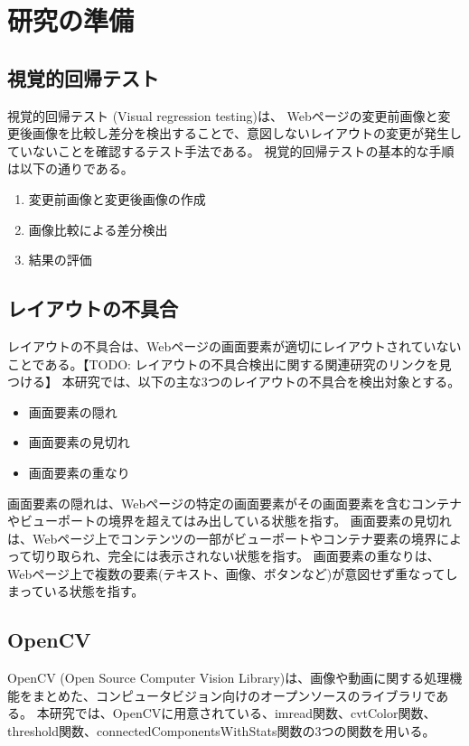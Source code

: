 \chapter{研究の準備}\label{cha:Preparation}

\section{視覚的回帰テスト}\label{sec:vrt}
視覚的回帰テスト (Visual regression testing)\cite{Visual regression testing}は、
Webページの変更前画像と変更後画像を比較し差分を検出することで、意図しないレイアウトの変更が発生していないことを確認するテスト手法である。
視覚的回帰テストの基本的な手順は以下の通りである。
\begin{enumerate}
    \setlength{\itemsep}{0pt}
          \setlength{\parsep}{0pt}
    \item 変更前画像と変更後画像の作成
    \item 画像比較による差分検出
    \item 結果の評価
\end{enumerate}

\section{レイアウトの不具合}\label{sec:layout effect}
レイアウトの不具合は、Webページの画面要素が適切にレイアウトされていないことである。【TODO: レイアウトの不具合検出に関する関連研究のリンクを見つける】
本研究では、以下の主な3つのレイアウトの不具合を検出対象とする。
\begin{itemize}
    \setlength{\itemsep}{0pt}
          \setlength{\parsep}{0pt}
    \item 画面要素の隠れ
    \item 画面要素の見切れ
    \item 画面要素の重なり
\end{itemize}
画面要素の隠れは、Webページの特定の画面要素がその画面要素を含むコンテナやビューポートの境界を超えてはみ出している状態を指す。
画面要素の見切れは、Webページ上でコンテンツの一部がビューポートやコンテナ要素の境界によって切り取られ、完全には表示されない状態を指す。
画面要素の重なりは、Webページ上で複数の要素(テキスト、画像、ボタンなど)が意図せず重なってしまっている状態を指す。

\section{OpenCV}
\label{sec:opencv}
OpenCV (Open Source Computer Vision Library)は、画像や動画に関する処理機能をまとめた、コンピュータビジョン向けのオープンソースのライブラリである\cite{OpenCV}。
本研究では、OpenCVに用意されている、imread関数、cvtColor関数、threshold関数、connectedComponentsWithStats関数の3つの関数を用いる。

